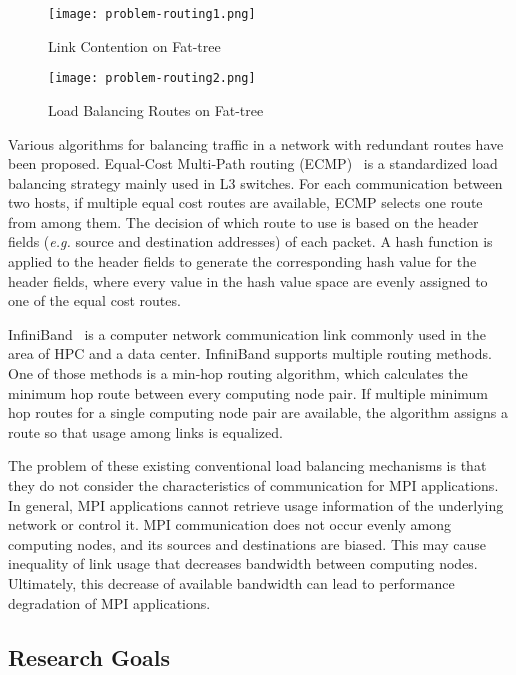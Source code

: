 \begin{figure}
    \centering
    \texttt{[image: problem-routing1.png]}
    \caption{Link Contention on Fat-tree}%
    \label{fig:problem-routing1}
\end{figure}

\begin{figure}
    \centering
    \texttt{[image: problem-routing2.png]}
    \caption{Load Balancing Routes on Fat-tree}%
    \label{fig:problem-routing2}
\end{figure}

Various algorithms for balancing traffic in a network with redundant
routes have been proposed. Equal-Cost Multi-Path routing (ECMP)~\autocite{ecmp} is
a standardized load balancing strategy mainly used in L3 switches. For each
communication between two hosts, if multiple equal cost routes are available,
ECMP selects one route from among them. The decision of which route to use is
based on the header fields (\emph{e.g.} source and destination addresses) of
each packet. A hash function is applied to the header fields to generate the
corresponding hash value for the header fields, where every value in the hash
value space are evenly assigned to one of the equal cost routes.

InfiniBand~\autocite{infiniband} is a computer network communication link
commonly used in the area of HPC and a data center. InfiniBand supports
multiple routing methods. One of those methods is a min-hop routing
algorithm, which calculates the minimum hop route between every
computing node pair. If multiple minimum hop routes for a single
computing node pair are available, the algorithm assigns a route so that
usage among links is equalized.

The problem of these existing conventional load balancing mechanisms is
that they do not consider the characteristics of communication for MPI
applications. In general, MPI applications cannot retrieve usage
information of the underlying network or control it. MPI communication
does not occur evenly among computing nodes, and its sources and
destinations are biased. This may cause inequality of link usage that
decreases bandwidth between computing nodes. Ultimately, this decrease
of available bandwidth can lead to performance degradation of MPI
applications.

\subsection{Research Goals}

